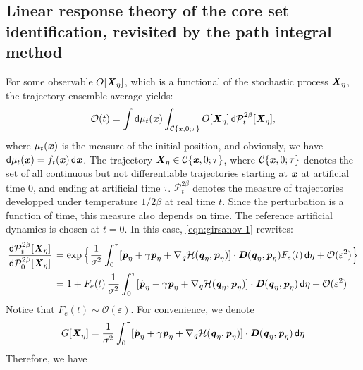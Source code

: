 \documentclass[aip,jcp,a4paper,reprint,onecolumn]{revtex4-1}
\newcommand{\vect}[1]{\textbf{\textit{#1}}}
\newcommand{\dd}{\textsf{d}}
\newcommand{\mh}{\mathcal H}
\newcommand{\mo}{\mathcal O}
\newcommand{\mc}{\mathcal C}
\begin{document}
\subsection{Linear response theory of the core set identification,
  revisited by the path integral method}
For some observable $O[\vect X_\eta]$, which is a functional of the
stochastic process $\vect X_\eta$,
the trajectory ensemble average yields:
\begin{align}
  \mo(t)
  =
  \int \dd \mu_t(\vect x)
  \int_{\mc\{\vect x,0;\tau\}}
  O[\vect X_\eta]\,
  \dd \mathcal P^{2\beta}_t[\vect X_\eta],
\end{align}
where $\mu_t(\vect x)$
is the measure of the initial position, and obviously, we have
$\dd \mu_t(\vect x) = f_t(\vect x)\,\dd \vect x$.
The trajectory $\vect X_\eta \in {\mc\{\vect x,0;\tau\}}$, where
${\mc\{\vect x,0;\tau\}}$ denotes the set of all continuous but not
differentiable trajectories starting at $\vect x$ at artificial
time 0, and ending
at artificial time $\tau$.
$\mathcal P^{2\beta}_t$ denotes the measure of trajectories
developped under temperature $1/2\beta$
at real time $t$.
Since the perturbation is a function of time, this
measure also depends on time. The reference artificial dynamics is chosen
at $t=0$.
In this case, \eqref{eqn:girsanov-1} rewrites:
\begin{align}\nonumber
  \frac{\dd \mathcal P^{2\beta}_t[\vect X_\eta]}
  {\dd \mathcal P^{2\beta}_0[\vect X_\eta]}\,
  &=
  \exp
  \Big\{
  \frac 1 {\sigma^2}
  \int_0^\tau
  [\dot{\vect p}_\eta +
  \gamma\vect p_\eta +
  \nabla_{\vect q}\mh(\vect q_\eta,\vect p_\eta)
  ]\cdot
  \vect D(\vect q_\eta,\vect p_\eta)
  F_e(t)\,
  \dd \eta
  + \mathcal O(\varepsilon^2)
  \Big\}\\
  &=
  1+
  F_e(t)\,
  \frac 1 {\sigma^2}
  \int_0^\tau
  [\dot{\vect p}_\eta +
  \gamma\vect p_\eta +
  \nabla_{\vect q}\mh(\vect q_\eta,\vect p_\eta)
  ]\cdot
  \vect D(\vect q_\eta,\vect p_\eta)\,
  \dd \eta
  + \mathcal O(\varepsilon^2)  
\end{align}
Notice that $F_e(t)\sim \mo(\varepsilon)$.
For convenience, we denote
\begin{align}
  G[\vect X_\eta] =
    \frac 1 {\sigma^2}
  \int_0^\tau
  [\dot{\vect p}_\eta +
  \gamma\vect p_\eta +
  \nabla_{\vect q}\mh(\vect q_\eta,\vect p_\eta)
  ]\cdot
  \vect D(\vect q_\eta,\vect p_\eta)\,
  \dd \eta
\end{align}
Therefore, we have
\end{document}
